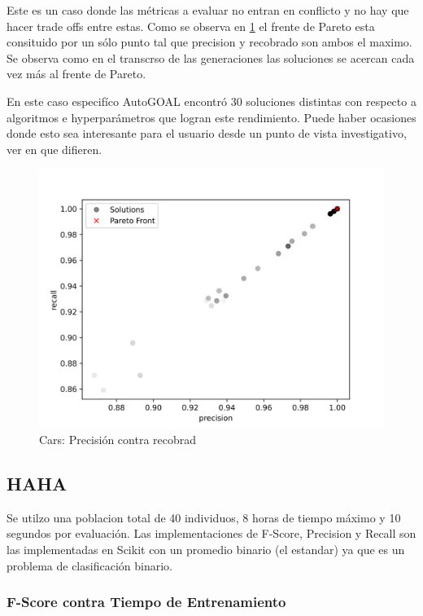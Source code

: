 Este es un caso donde las m\'etricas a evaluar no entran en conflicto y no hay que hacer trade offs entre estas. Como se observa en \ref{impl:fig:cars:precision_vs_recall} el frente de Pareto esta consituido por un s\'olo punto tal que precision y recobrado son ambos el maximo. Se observa como en el transcrso de las generaciones las soluciones se acercan cada vez m\'as al frente de Pareto.

En este caso especif\'ico AutoGOAL encontr\'o 30 soluciones distintas con respecto a algoritmos e hyperpar\'ametros que logran este rendimiento. Puede haber ocasiones donde esto sea interesante para el usuario desde un punto de vista investigativo, ver en que difieren.


\begin{figure}[ht]
    \includegraphics[width=\linewidth]{Pictures/cars_precision_vs_recall.jpg}
    \caption{Cars: Precisi\'on contra recobrad}
    \label{impl:fig:cars:precision_vs_recall}
\end{figure}

\subsection{HAHA}

Se utilzo una poblacion total de 40 individuos, 8 horas de tiempo m\'aximo y 10 segundos por  evaluaci\'on. Las implementaciones de F-Score, Precision y Recall son las implementadas en Scikit con un promedio binario (el estandar) ya que es un problema de clasificaci\'on binario.

\subsubsection{F-Score contra Tiempo de Entrenamiento}

